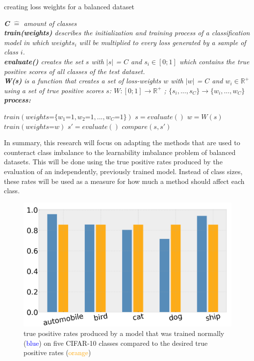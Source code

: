 \documentclass[journal]{IEEEtran}
\begin{document}
\begin{algorithm}[H]
        \caption{creating loss weights for a balanced dataset}

        \textit{\textbf{C} $\hat{=}$ amount of classes}
        \\ \textit{\textbf{train(weights)} describes the initialization and training process of a classification model in which $weights_i$ will be multiplied to every loss generated by a sample of class $i$.}
        \\ \textit{\textbf{evaluate()} creates the set $s$ with $\left|s\right|$ = $C$ and $s_i \in [0;1]$ which contains the true positive scores of all classes of the test dataset.}
        \\ \textit{\textbf{W(s)} is a function that creates a set of loss-weights $w$ with $\left|w\right|$ = $C$ and $w_i \in \mathbb{R}^{+}$ using a set of true positive scores $s$: $W: [0;1] \rightarrow \mathbb{R}^{+}$ ; $\{s_i,...,s_C\} \rightarrow \{w_i,...,w_C\}$ }
        \\ \textit{\textbf{process:}}
        \begin{algorithmic}[1]
         \STATE $train(weights\texttt{=}\{w_1\texttt{=}1, w_2\texttt{=}1, ..., w_C\texttt{=}1\})$
         \STATE $s = evaluate()$
         \STATE $w = W(s)$
         \STATE $train(weights\texttt{=}w)$
         \STATE $s' = evaluate()$
         \STATE $compare(s, s')$

        \end{algorithmic}
\end{algorithm}

In summary, this research will focus on adapting the methods that are used to counteract class imbalance to the learnability imbalance problem of balanced datasets.
This will be done using the true positive rates produced by the evaluation of an independently, previously trained model.
Instead of class sizes, these rates will be used as a measure for how much a method should affect each class.

\begin{figure}[h!]
        \includegraphics[width=\linewidth]{images/tp_comparison.png}
        \caption{true positive rates produced by a model that was trained normally (\textcolor{blue}{blue}) on five CIFAR-10 classes compared to the desired true positive rates (\textcolor{orange}{orange})}
        \label{fig:tp_comparsion}
\end{figure}
\end{document}
